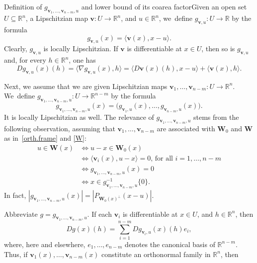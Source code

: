 \documentclass[JEP,XML,SOM,Unicode,ThmDefs,NoEqCountersInSection]{cedram}
\newenvironment{Empty}[2][\null]{%
\begin{enonce}[remark]{#1}#2}
{\end{enonce}}
\newcommand{\R}{\mathbb{R}}
\newcommand{\Rn}{\R^n}
\newcommand{\bW}{{\boldsymbol{W}}}
\newcommand{\bv}{{\boldsymbol{v}}}
\let\la\langle
\let\ra\rangle
\let\subset\subseteq
\begin{document}
\begin{Empty}[Definition of $g_{\bv_1,\ldots,\bv_{n-m},u}$ and lower bound of its coarea factor]
Given an open set $U \subset \Rn$, a Lipschitzian map $\bv: U \to \Rn$, and $u \in \Rn$, we~define $g_{\bv,u}: U \to \R$ by the formula
\begin{equation*}
g_{\bv,u}(x) = \la \bv(x), x-u \ra.
\end{equation*}
Clearly, $g_{\bv,u}$ is locally Lipschitzian.
If $\bv$ is differentiable at $x \in U$, then so is $g_{\bv,u}$ and, for every $h \in \Rn$, one has
\begin{equation}
\label{eq.2}
Dg_{\bv,u}(x)(h) = \la \nabla g_{\bv,u}(x),h \ra = \la D\bv(x)(h), x-u \ra + \la \bv(x), h \ra.
\end{equation}
\par
Next, we assume that we are given Lipschitzian maps $\bv_1,\ldots,\bv_{n-m}: U \to \Rn$.
We~define $g_{\bv_1,\ldots,\bv_{n-m},u}: U \to \R^{n-m}$ by the formula
\begin{equation*}
g_{\bv_1,\ldots,\bv_{n-m},u}(x) = \bigl(g_{\bv_1,u}(x), \ldots, g_{\bv_{n-m},u}(x) \bigr).
\end{equation*}
It is locally Lipschitzian as well.
The relevance of $g_{\bv_1,\ldots,\bv_{n-m},u}$ stems from the following observation, assuming that $\bv_1,\ldots,\bv_{n-m}$ are associated with $\bW_0$ and $\bW$ as in~\ref{orth.frame} and \ref{W}:
\begin{equation}
\label{eq.7}
\begin{split}
u \in \bW(x) & \iff u-x \in \bW_0(x) \\
& \iff \la \bv_i(x), u-x \ra = 0 \text{, for all } i=1,\ldots,n-m \\
& \iff g_{\bv_1,\ldots,\bv_{n-m},u}(x)=0 \\
& \iff x \in g_{\bv_1,\ldots,\bv_{n-m},u}^{-1}\{0\}.
\end{split}
\end{equation}
In fact, $|g_{\bv_1,\ldots,\bv_{n-m},u}(x)| = \left| P_{\bW_0(x)^\perp}(x-u)\right|$.
\par
Abbreviate $g = g_{\bv_1,\ldots,\bv_{n-m},u}$.
If each $\bv_i$ is differentiable at $x \in U$, and $h \in \Rn$, then
\begin{equation*}
Dg(x)(h) = \sum_{i=1}^{n-m} Dg_{\bv_i,u}(x)(h)e_i,
\end{equation*}
where, here and elsewhere, $e_1,\ldots,e_{n-m}$ denotes the canonical basis of $\R^{n-m}$.
Thus, if $\bv_1(x),\ldots,\bv_{n-m}(x)$ constitute an orthonormal family in $\Rn$, then
\begin{equation*}

\end{equation*}
\end{Empty}
\end{document}
